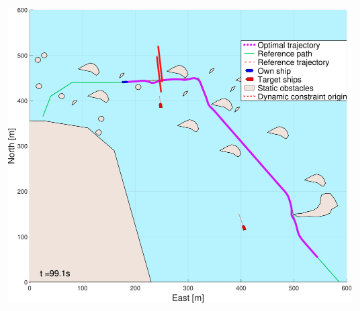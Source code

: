 \begin{figure}[!ht]
\begin{subfigure}[b]{0.494\textwidth}
        \includegraphics[width=\textwidth]{Images/NewFigures/skjergard_m_trafikk_NEW/_Simple_1fig999_time=100}
        \subcaption{}
    \end{subfigure}
    \hfill
    \label{FIG: Skjaergard with traffic and simple pred}
\end{figure}%

